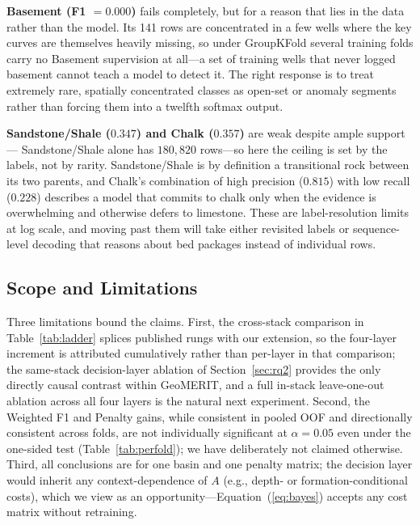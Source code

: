 \documentclass[bdcc,article,submit,pdftex,moreauthors]{Definitions/mdpi}
\begin{document}
\textbf{Basement (F1 $=0.000$)} fails completely, but for a reason that lies in the data rather
than the model. Its 141 rows are concentrated in a few wells where the key curves are
themselves heavily missing, so under GroupKFold several training folds carry no Basement
supervision at all---a set of training wells that never logged basement cannot teach a model to detect it.
The right response is to treat extremely rare, spatially concentrated classes as open-set or
anomaly segments rather than forcing them into a twelfth softmax output.

\textbf{Sandstone/Shale ($0.347$) and Chalk ($0.357$)} are weak despite ample support---
Sandstone/Shale alone has $180{,}820$ rows---so here the ceiling is set by the labels, not by
rarity. Sandstone/Shale is by definition a transitional rock between its two parents, and
Chalk's combination of high precision ($0.815$) with low recall ($0.228$) describes a model
that commits to chalk only when the evidence is overwhelming and otherwise defers to limestone.
These are label-resolution limits at log scale, and moving past them will take either revisited
labels or sequence-level decoding that reasons about bed packages instead of individual rows.

\subsection{Scope and Limitations}
\label{sec:limits}
Three limitations bound the claims. First, the cross-stack comparison in
Table~\ref{tab:ladder} splices published rungs with our extension, so the four-layer
increment is attributed cumulatively rather than per-layer in that comparison; the
same-stack decision-layer ablation of Section~\ref{sec:rq2} provides the only directly
causal contrast within GeoMERIT, and a full in-stack leave-one-out ablation across all four
layers is the natural next experiment. Second, the Weighted F1 and Penalty gains, while
consistent in pooled OOF and directionally consistent across folds, are not individually
significant at $\alpha=0.05$ even under the one-sided test (Table~\ref{tab:perfold}); we
have deliberately not claimed otherwise. Third, all conclusions are for one basin and one
penalty matrix; the decision layer would inherit any context-dependence of $A$ (e.g., depth-
or formation-conditional costs), which we view as an opportunity---Equation~(\ref{eq:bayes})
accepts any cost matrix without retraining.
\end{document}
